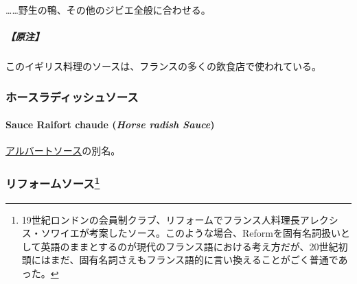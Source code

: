 \begin{recette}
\ldots{}\ldots{}野生の鴨、その他のジビエ全般に合わせる。

\hypertarget{ux539fux6ce8-2}{%
\subparagraph{【原注】}\label{ux539fux6ce8-2}}

このイギリス料理のソースは、フランスの多くの飲食店で使われている。

\maeaki

\hypertarget{ux30dbux30fcux30b9ux30e9ux30c7ux30a3ux30c3ux30b7ux30e5ux30bdux30fcux30b9}{%
\subsubsection{ホースラディッシュソース}\label{ux30dbux30fcux30b9ux30e9ux30c7ux30a3ux30c3ux30b7ux30e5ux30bdux30fcux30b9}}

\hypertarget{horse-radish-sauce}{%
\paragraph{\texorpdfstring{Sauce Raifort chaude (\emph{Horse radish
Sauce})}{Sauce Raifort chaude (Horse radish Sauce)}}\label{horse-radish-sauce}}


\protect\hyperlink{albert-sauce}{アルバートソース}の別名。

\maeaki

\hypertarget{ux30eaux30d5ux30a9ux30fcux30e0ux30bdux30fcux30b948}{%
\subsubsection[リフォームソース]{\texorpdfstring{リフォームソース\footnote{19世紀ロンドンの会員制クラブ、リフォームでフランス人料理長アレクシス・ソワイエが考案したソース。このような場合、Reformを固有名詞扱いとして英語のままとするのが現代のフランス語における考え方だが、20世紀初頭にはまだ、固有名詞さえもフランス語的に言い換えることがごく普通であった。}}{リフォームソース}}\label{ux30eaux30d5ux30a9ux30fcux30e0ux30bdux30fcux30b948}}


\end{recette}

